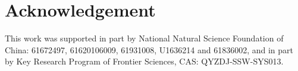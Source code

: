 \documentclass[letterpaper]{article} %
\begin{document}
\section{Acknowledgement}
This work was supported in part by National Natural Science Foundation of China: 61672497, 61620106009, 61931008, U1636214 and 61836002, and in part by Key Research Program of Frontier Sciences, CAS: QYZDJ-SSW-SYS013.



\end{document}
